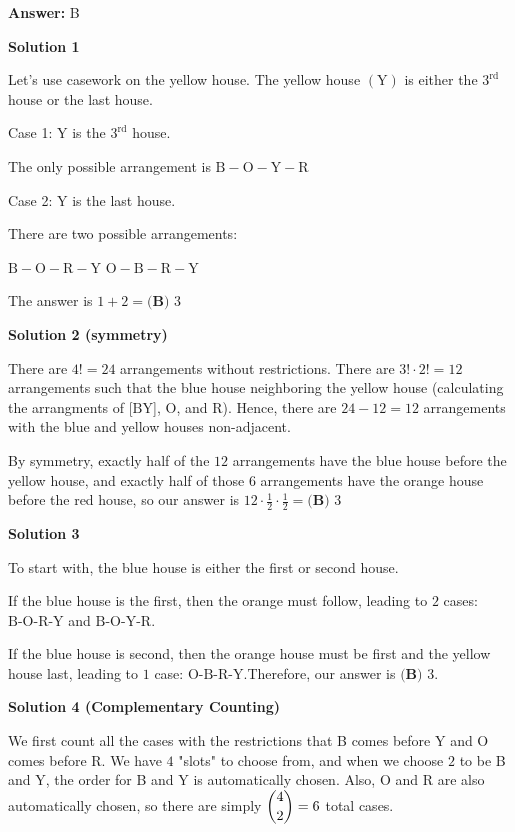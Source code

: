 \begin{enumerate}
 \textbf{Answer: }B



\textbf{Solution 1}

Let's use casework on the yellow house. The yellow house $(\text{Y})$ is either the $3^\text{rd}$ house or the last house.

 Case 1: $\text{Y}$ is the $3^\text{rd}$ house.

 The only possible arrangement is $\text{B}-\text{O}-\text{Y}-\text{R}$

 Case 2: $\text{Y}$ is the last house.

 There are two possible arrangements:

 $\text{B}-\text{O}-\text{R}-\text{Y}$
$\text{O}-\text{B}-\text{R}-\text{Y}$ 

 The answer is $1+2=\boxed{\textbf{(B) } 3}$




\textbf{Solution 2 (symmetry)}

There are $4!=24$ arrangements without restrictions. There are $3!\cdot2!=12$ arrangements such that the blue house neighboring the yellow house (calculating the arrangments of [$\text{BY}$], $\text{O}$, and $\text{R}$). Hence, there are $24-12=12$ arrangements with the blue and yellow houses non-adjacent.

 By symmetry, exactly half of the $12$ arrangements have the blue house before the yellow house, and exactly half of those $6$ arrangements have the orange house before the red house, so our answer is $12\cdot\frac{1}{2}\cdot\frac{1}{2}= \boxed{\textbf{(B) } 3}$




\textbf{Solution 3}

To start with, the blue house is either the first or second house.

 If the blue house is the first, then the orange must follow, leading to $2$ cases: $\text{B-O-R-Y}$ and $\text{B-O-Y-R}$. 

 If the blue house is second, then the orange house must be first and the yellow house last, leading to $1$ case: $\text{O-B-R-Y}$.Therefore, our answer is $\boxed{\textbf{(B) } 3}$.

 



\textbf{Solution 4 (Complementary Counting)}

We first count all the cases with the restrictions that B comes before Y and O comes before R. We have $4$ "slots" to choose from, and when we choose $2$ to be B and Y, the order for B and Y is automatically chosen. Also, O and R are also automatically chosen, so there are simply $\dbinom42=6$ total cases. 


\end{enumerate}
